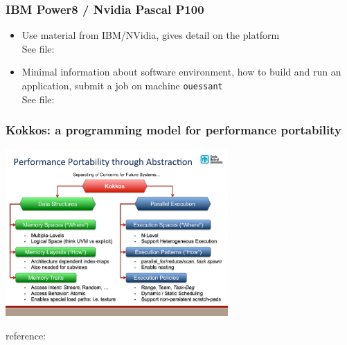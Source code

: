 \begin{frame}
  \frametitle{IBM Power8 / Nvidia Pascal P100}

  \begin{itemize}
  \item Use material from IBM/NVidia, gives detail on the platform\\
      See file: 
    \item Minimal information about software environment, how to build and run an application, submit a job on machine \texttt{ouessant}\\
      See file: 
  \end{itemize}

\end{frame}

\begin{frame}
  \frametitle{Kokkos: a programming model for performance portability}

  \begin{center}
    \includegraphics[width=8.5cm]{../intro/images/Kokkos-Multi-CoE_slide3}
  \end{center}

  {\small reference: }

\end{frame}

